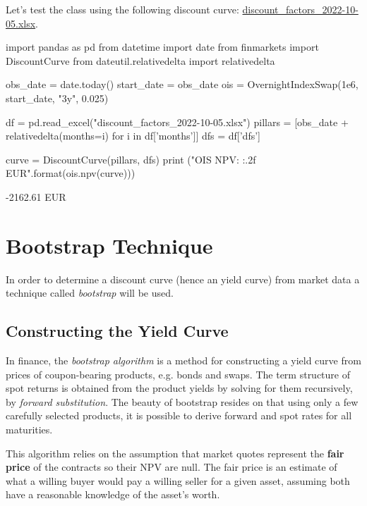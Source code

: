 Let's test the class using the following discount curve: \href{https://github.com/matteosan1/finance_course/raw/master/input_files/discount_factors_2022-10-05.xlsx}{discount\_factors\_2022-10-05.xlsx}.

\begin{ipython}
import pandas as pd
from datetime import date
from finmarkets import DiscountCurve
from dateutil.relativedelta import relativedelta

obs_date = date.today()
start_date = obs_date
ois = OvernightIndexSwap(1e6,
                         start_date, 
                         "3y",
                         0.025)

df = pd.read_excel("discount_factors_2022-10-05.xlsx")
pillars = [obs_date + relativedelta(months=i) for i in df['months']]
dfs = df['dfs']

curve = DiscountCurve(pillars, dfs)
print ("OIS NPV: {:.2f} EUR".format(ois.npv(curve)))
\end{ipython}
\begin{ioutput}
-2162.61 EUR
\end{ioutput}

\section{Bootstrap Technique}
\label{bootstrapping-technique}

In order to determine a discount curve (hence an yield curve) from market data a technique called \emph{bootstrap} will be used.


\subsection{Constructing the Yield Curve}
\label{the-bootstrapping-technique}

In finance, the \emph{bootstrap algorithm} is a method for constructing a yield curve from prices of coupon-bearing products, e.g. bonds and swaps. The term structure of spot returns is obtained from the product yields by solving for them recursively, by \emph{forward substitution}. 
The beauty of bootstrap resides on that using only a few carefully selected products, it is possible to derive forward and spot rates for all maturities.

This algorithm relies on the assumption that market quotes represent the \textbf{fair price} of the contracts so their NPV are null. The fair price is an estimate of what a willing buyer would pay a willing seller for a given asset, assuming both have a reasonable knowledge of the asset's worth.

